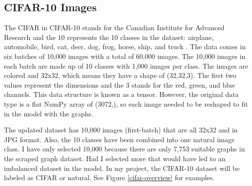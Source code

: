 \documentclass[12pt]{article}
\begin{document}
        \subsection{CIFAR-10 Images}
    
            The CIFAR in CIFAR-10 stands for the Canadian Institute for Advanced Research and the 10 represents the 10 classes in the dataset: 
            airplane, automobile, bird, cat, deer, dog, frog, horse, ship, and truck \cite{krizhevsky2009}. 
            The data comes in six batches of 10,000 images with a total of 60,000 images. 
            The 10,000 images in each batch are made up of 10 classes with 1,000 images per class. 
            The images are colored and 32x32, which means they have a shape of (32,32,3). 
            The first two values represent the dimensions and the 3 stands for the red, green, and blue channels. 
            This data structure is known as a tensor. However, the original data type is a flat NumPy array of (3072,), 
            so each image needed to be reshaped to fit in the model with the graphs.

            The updated dataset has 10,000 images (first-batch) that are all 32x32 and in JPG format. 
            Also, the 10 classes have been combined into one natural image class. 
            I have only selected 10,000 because there are only 7,753 suitable graphs in the scraped graph dataset. 
            Had I selected more that would have led to an imbalanced dataset in the model. 
            In my project, the CIFAR-10 dataset will be labeled as CIFAR or natural. See Figure \ref{cifar-overview} for examples.
\end{document}
